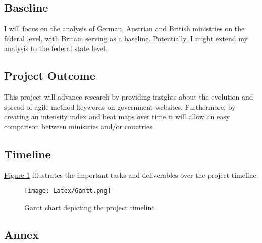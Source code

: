 \documentclass[a4paper]{article}
\begin{document}
\begin{spacing}{1.5}
%
\subsection*{Baseline}
I will focus on the analysis of German, Austrian and British ministries on the federal level, with Britain serving as a baseline. Potentially, I might extend my analysis to the federal state level.
\subsection*{Project Outcome}
This project will advance research by providing insights about the evolution and spread of agile method keywords on government websites. Furthermore, by creating an intensity index and heat maps over time it will allow an easy comparison between ministries and/or countries.
%
\begin{landscape}
\subsection*{Timeline}

\hyperref[Gantt Chart]{Figure 1} illustrates the important tasks and deliverables over the project timeline.
\begin{figure}[h!]
	\centering
	\texttt{[image: Latex/Gantt.png]}
	\caption[Gantt chart depicting the project timeline]{Gantt chart depicting the project timeline}\label{Gantt Chart}
\end{figure}
\end{landscape}
\end{spacing}
\newpage
\printbibliography

\newpage
{}
\begin{center}
\subsection*{\hfill Annex \hfill}\label{Annex}
\end{center}
\end{document}
